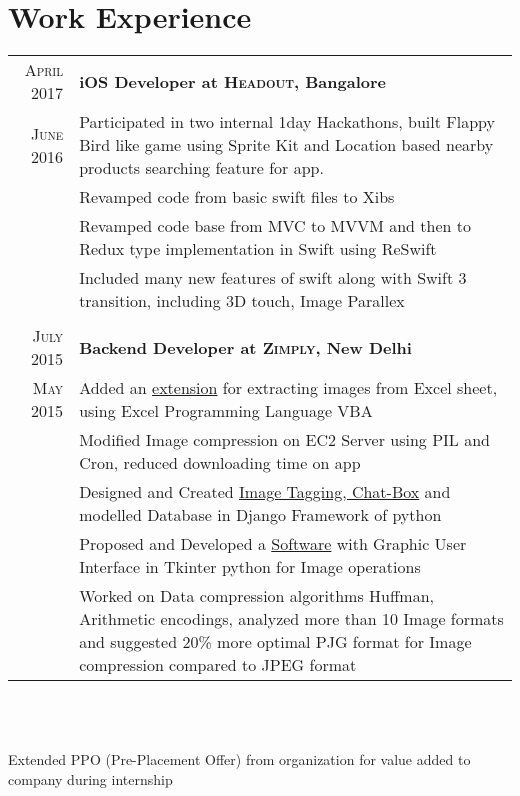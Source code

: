 \documentclass[a4paper,10pt]{article}
\begin{document}
\section{Work Experience}
\begin{tabular}{r|p{16cm}}

\textsc{April 2017} & \textbf{iOS Developer at \textsc{Headout}, Bangalore} \\
 \textsc{June 2016} & Participated in two internal 1day Hackathons, built Flappy Bird like game using Sprite Kit and Location based nearby products searching feature for app.\\
& Revamped code from basic swift files to Xibs\\
& Revamped code base from MVC to MVVM and then to Redux type implementation in Swift using ReSwift\\
& Included many new features of swift along with Swift 3 transition, including 3D touch, Image Parallex\\\multicolumn{2}{c}{}\\
 
 \textsc{July 2015} & \textbf{Backend Developer at \textsc{Zimply}, New Delhi} \\
 \textsc{May 2015} & Added an \href{https://github.com/kautsiitd/Image-Extractor-for-Excel}{extension} for extracting images from Excel sheet, using Excel Programming Language VBA\\
& Modified Image compression on EC2 Server using PIL and Cron, reduced downloading time on app\\
& Designed and Created \href{https://github.com/kautsiitd/Image-Tagging-and-Chat-Box}{Image Tagging, Chat-Box} and modelled Database in Django Framework of python\\
& Proposed and Developed a \href{https://github.com/kautsiitd/Image-Optimizer}{Software} with Graphic User Interface in Tkinter python for Image operations\\
& Worked on Data compression algorithms Huffman, Arithmetic encodings, analyzed more than 10 Image formats and suggested 20\% more optimal PJG format for Image compression compared to  JPEG format\\
\end{tabular}\\\\
\centerline{Extended PPO (Pre-Placement Offer) from organization for value added to company during internship}\\

\end{document}
